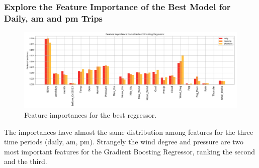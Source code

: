 \documentclass[a4paper]{article}
\begin{document}
			\subsubsection{Explore the Feature Importance of the Best Model for Daily, am and pm Trips}
			
			\begin{figure}
				\centering
				\includegraphics[width=1\textwidth]{RegressorImportance.png}				\caption{\label{fig:regressor_importance}Feature importances for the best regressor.}	
			\end{figure}	
			
			The importances have almost the same distribution among features for the three time periods (daily, am, pm). Strangely the wind degree and pressure are two most important features for the Gradient Boosting Regressor, ranking the second and the third.
			
\end{document}
